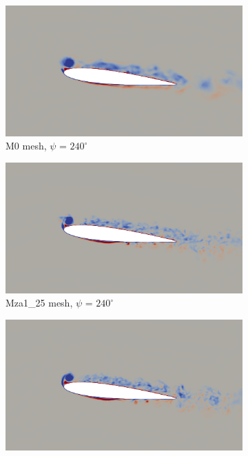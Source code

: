 

\begin{figure}[H]
	\centering
	\begin{center}
		\begin{subfigure}[b]{0.475\textwidth}
			\centering
			\includegraphics[width=1\textwidth]{figures/zonal_adapt_results/vorticity_plots_Re200k/M0/phase_240.png}
			\caption{M0 mesh, $\psi$ = $240^\circ$}
			\label{fig:M0_Re200k_sp_psi240}
		\end{subfigure}
	\end{center}
	\begin{subfigure}[b]{0.475\textwidth}
		\centering
		\includegraphics[width=1\textwidth]{figures/zonal_adapt_results/vorticity_plots_Re200k/Mza1_50/phase_240.png}
		\caption{Mza1\_25 mesh, $\psi$ = $240^\circ$}
		\label{fig:Mza1_50_Re200k_sp_psi240}
	\end{subfigure}
	\begin{subfigure}[b]{0.475\textwidth}
		\centering
		\includegraphics[width=1\textwidth]{figures/zonal_adapt_results/vorticity_plots_Re200k/Mza1_100/phase_240.png}

\end{subfigure}
\end{figure}
